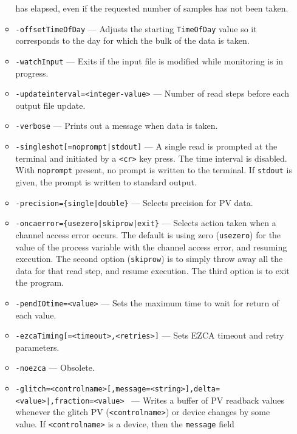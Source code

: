 \begin{itemize}
\begin{itemize}
                has elapsed, even if the requested number of samples has not been taken.
        \item {\tt -offsetTimeOfDay} --- Adjusts the starting \verb+TimeOfDay+ value so it corresponds
                to the day for which the bulk of the data is taken.
        \item {\tt -watchInput} --- Exits if the input file is modified while monitoring is in progress.
        \item {\tt -updateinterval=<integer-value>} --- Number of read steps before each output file update.
        \item {\tt -verbose} --- Prints out a message when data is taken.
        \item {\verb+-singleshot[=noprompt|stdout]+} --- A single read is prompted at the terminal
                and initiated by a \verb+<cr>+ key press. The time interval is disabled.
                With \verb+noprompt+ present, no prompt is written to the terminal. If \verb+stdout+
                is given, the prompt is written to standard output.
        \item {\verb+-precision={single|double}+} --- Selects precision for PV data.
        \item {\verb+-oncaerror={usezero|skiprow|exit}+} --- Selects action taken when a channel access error occurs.
                The default is using zero (\verb+usezero+) for the value of the process variable
                with the channel access error, and resuming execution. The second option (\verb+skiprow+) is to
                simply throw away all the data for that read step, and resume execution.
                The third option is to exit the program.
        \item {\tt -pendIOtime=<value>} --- Sets the maximum time to wait for return of each value.
        \item {\tt -ezcaTiming[=<timeout>,<retries>]} --- Sets EZCA timeout and retry parameters.
        \item {\tt -noezca} --- Obsolete.
        \item {\tt -glitch=<controlname>[,message=<string>]{,delta=<value>|,fraction=<value>} \newline
[,before=<number>][,after=<number>][,{baseline=<number>|filterFraction=<value>}][,sign={+|-}][,noReset][,{autoHoldoff|holdoff=<seconds>}]} ---
                Writes a buffer of PV readback values whenever the glitch PV (\verb+<controlname>+) or
                device changes by some value. If \verb+<controlname>+ is a device, then the \verb+message+ field

\end{itemize}
\end{itemize}
